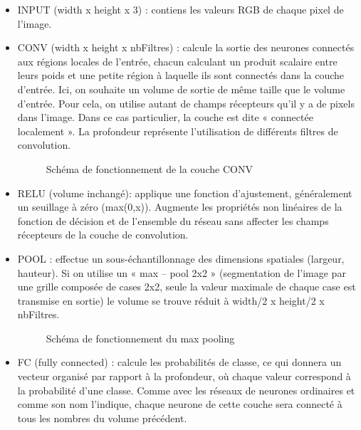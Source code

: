 \documentclass[debug,nodate,hideweeklyreports,noposter]{polytech/polytech}
\begin{document}
 \begin{itemize}
\item INPUT (width x height x 3) : contiens les valeurs RGB de chaque pixel de l’image.
\item CONV (width x height x nbFiltres) : calcule la sortie des neurones connectés aux régions locales de l'entrée, chacun calculant un produit scalaire entre leurs poids et une petite région à laquelle ils sont connectés dans la couche d'entrée. Ici, on souhaite un volume de sortie de même taille que le volume d'entrée. Pour cela, on utilise autant de champs récepteurs qu’il y a de pixels dans l’image. Dans ce cas particulier, la couche est dite « connectée localement ». La profondeur représente l’utilisation de différents filtres de convolution.

\begin{figure}
  \caption{Schéma de fonctionnement de la couche CONV}
  \label{fig:cnnconvlayers}
\end{figure}

\item RELU (volume inchangé): applique une fonction d’ajustement, généralement un seuillage à zéro (max(0,x)). Augmente les propriétés non linéaires de la fonction de décision et de l'ensemble du réseau sans affecter les champs récepteurs de la couche de convolution.
\item POOL : effectue un sous-échantillonnage des dimensions spatiales (largeur, hauteur). Si on utilise un « max – pool 2x2 » (segmentation de l’image par une grille composée de cases 2x2, seule la valeur maximale de chaque case est transmise en sortie) le volume se trouve réduit à width/2 x height/2 x nbFiltres.

\begin{figure}
  \caption{Schéma de fonctionnement du max pooling}
  \label{fig:cnnmaxpooling}
\end{figure}

\item FC (fully connected) : calcule les probabilités de classe, ce qui donnera un vecteur organisé par rapport à la profondeur, où chaque valeur correspond à la probabilité d’une classe. Comme avec les réseaux de neurones ordinaires et comme son nom l'indique, chaque neurone de cette couche sera connecté à tous les nombres du volume précédent.
\end{itemize}
\end{document}

